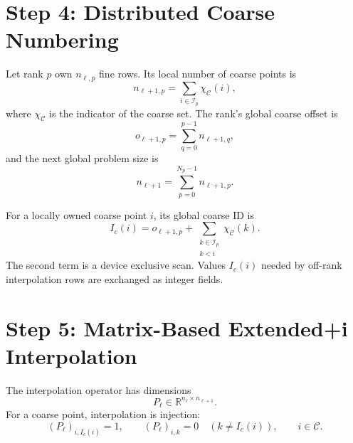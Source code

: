 \documentclass[11pt]{article}
\newcommand{\R}{\mathbb{R}}
\newcommand{\level}{\ell}
\begin{document}
\section{Step 4: Distributed Coarse Numbering}

Let rank $p$ own $n_{\level,p}$ fine rows.  Its local number of coarse points
is
\begin{equation}
  n_{\level+1,p}
  =
  \sum_{i\in\mathcal I_p}
  \chi_{\mathcal C}(i),
  \label{eq:local-coarse-count}
\end{equation}
where $\chi_{\mathcal C}$ is the indicator of the coarse set.  The rank's
global coarse offset is
\begin{equation}
  o_{\level+1,p}
  =
  \sum_{q=0}^{p-1}n_{\level+1,q},
  \label{eq:coarse-rank-offset}
\end{equation}
and the next global problem size is
\begin{equation}
  n_{\level+1}
  =
  \sum_{p=0}^{N_p-1}n_{\level+1,p}.
  \label{eq:global-coarse-count}
\end{equation}

For a locally owned coarse point $i$, its global coarse ID is
\begin{equation}
  I_c(i)
  =
  o_{\level+1,p}
  +
  \sum_{\substack{k\in\mathcal I_p\\k<i}}
  \chi_{\mathcal C}(k).
  \label{eq:coarse-id}
\end{equation}
The second term is a device exclusive scan.  Values $I_c(i)$ needed by
off-rank interpolation rows are exchanged as integer fields.

\section{Step 5: Matrix-Based Extended+i Interpolation}

The interpolation operator has dimensions
\begin{equation}
  P_\level\in\R^{n_\level\times n_{\level+1}}.
  \label{eq:p-dimensions}
\end{equation}
For a coarse point, interpolation is injection:
\begin{equation}
  (P_\level)_{i,I_c(i)}=1,
  \qquad
  (P_\level)_{i,k}=0\quad(k\neq I_c(i)),
  \qquad i\in\mathcal C.
  \label{eq:coarse-interpolation-row}
\end{equation}
\end{document}
